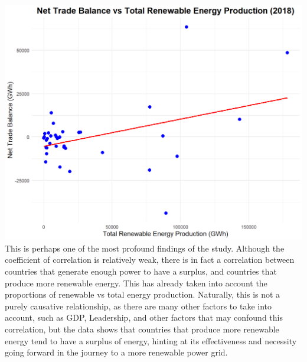 \documentclass[
  letterpaper,
  DIV=11,
  numbers=noendperiod]{scrartcl}
\begin{document}
\includegraphics{../images/corr_net_trade_energy.png} This is perhaps
one of the most profound findings of the study. Although the coefficient
of correlation is relatively weak, there is in fact a correlation
between countries that generate enough power to have a surplus, and
countries that produce more renewable energy. This has already taken
into account the proportions of renewable vs total energy production.
Naturally, this is not a purely causative relationship, as there are
many other factors to take into account, such as GDP, Leadership, and
other factors that may confound this correlation, but the data shows
that countries that produce more renewable energy tend to have a surplus
of energy, hinting at its effectiveness and necessity going forward in
the journey to a more renewable power grid.
\end{document}
